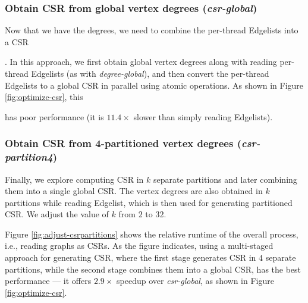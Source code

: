 \subsubsection{Obtain CSR from global vertex degrees (\textit{csr-global})}
\label{sec:csr-csr-global}

Now that we have the degrees, we need to combine the per-thread Edgelists into a CSR. In this approach, we first obtain global vertex degrees along with reading per-thread Edgelists (as with \textit{degree-global}), and then convert the per-thread Edgelists to a global CSR in parallel using atomic operations. As shown in Figure \ref{fig:optimize-csr}, this has poor performance (it is $11.4\times$ slower than simply reading Edgelists).





\subsubsection{Obtain CSR from 4-partitioned vertex degrees (\textit{csr-partition4})}
\label{sec:csr-csr-partition4}

Finally, we explore computing CSR in $k$ separate partitions and later combining them into a single global CSR. The vertex degrees are also obtained in $k$ partitions while reading Edgelist, which is then used for generating partitioned CSR. We adjust the value of $k$ from $2$ to $32$. Figure \ref{fig:adjust-csrpartitions} shows the relative runtime of the overall process, i.e., reading graphs as CSRs. As the figure indicates, using a multi-staged approach for generating CSR, where the first stage generates CSR in $4$ separate partitions, while the second stage combines them into a global CSR, has the best performance --- it offers $2.9\times$ speedup over \textit{csr-global}, as shown in Figure \ref{fig:optimize-csr}.

